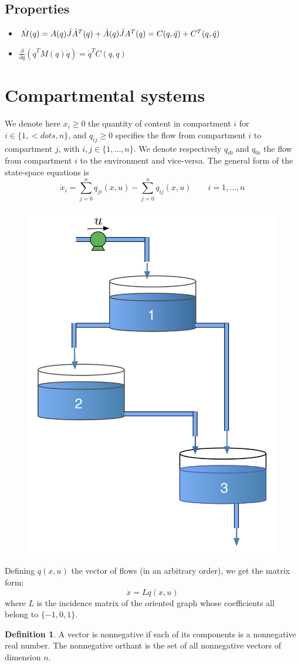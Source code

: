 \documentclass[12pt, openany]{report}
\theoremstyle{definition}
\newtheorem{definition}[thm]{Definition}
\begin{document}
\subsection{Properties}
\begin{itemize}
    \item $\dot M(q) = A(q)\Bar J\dot A^T(q) + \dot A(q)\bar JA^T(q)=C(q,\dot q)+C^T(q,\dot q)$
    \item $\frac{\partial }{\partial q}(\dot q^TM(q)\dot q)=\dot q^TC(q,\dot q)$
\end{itemize}
\section{Compartmental systems}
We denote here $x_i\ge 0$ the quantity of content in compartment $i$ for $i\in\{1,<dots,n\}$, and $q_{ij}\ge 0$ specifies the flow from compartment $i$ to compartment $j$, with $i,j\in\{1,\dots,n\}$. We denote respectively $q_{i0}$ and $q_{0i}$ the flow from compartment $i$ to the environment and vice-versa. The general form of the state-space equations is 
\begin{equation}
    \dot x_i = \sum_{j=0}^n q_{ji}(x,u) - \sum_{j=0}^n q_{ij}(x,u)\qquad i = 1,\dots,n 
\end{equation}
\begin{figure}[H]
    \centering
    \includegraphics[width = .3\textwidth]{img/compartment.png}
\end{figure}
Defining $q(x,u)$ the vector of flows (in an arbitrary order), we get the matrix form:
\begin{equation}
    \dot x= Lq(x,u)
\end{equation}
where $L$ is the incidence matrix of the oriented graph whose coefficients all belong to $\{-1,0,1\}$. 
\begin{definition}
    A vector is nonnegative if each of its components is a nonnegative real number. The nonnegative orthant is the set of all nonnegative vectors of dimension $n$.
\end{definition}
\end{document}
